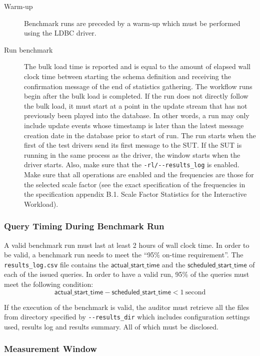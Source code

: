 \begin{description}
    \item[Warm-up] Benchmark runs are preceded by a warm-up which must be performed using the LDBC driver.
    \item[Run benchmark] The bulk load time is reported and is equal to the amount of elapsed wall clock time between starting the schema definition and receiving the confirmation message of the end of statistics gathering. The workflow runs begin after the bulk load is completed. If the run does not directly follow the bulk load, it must start at a point in the update stream that has not previously been played into the database. In other words, a run may only include update events whose timestamp is later than the latest message creation date in the database prior to start of run. The run starts when the first of the test drivers send its first message to the SUT. If the SUT is running in the same process as the driver, the window starts
    when the driver starts. Also, make sure that the \verb|-rl/--results_log| is enabled. Make sure that all operations are enabled and the frequencies are those for the selected scale factor (see the exact specification of the frequencies in the specification appendix B.1. Scale Factor Statistics for the Interactive Workload).
\end{description}

\subsubsection{Query Timing During Benchmark Run}
\label{sec:ontime-requirements}
A valid benchmark run must last at least 2 hours of wall clock time.
In order to be valid, a benchmark run needs to meet the ``95\% on-time requirement''.
The \texttt{results\_log.csv} file contains the $\mathsf{actual\_start\_time}$ and the $\mathsf{scheduled\_start\_time}$ of each of the issued queries. In order to have a valid run, 95\% of the queries must meet the following condition:
\begin{equation*}
\mathsf{actual\_start\_time} - \mathsf{scheduled\_start\_time} < 1\
\mathrm{second}
\end{equation*}

If the execution of the benchmark is valid, the auditor must retrieve all the files from directory specified by \verb|--results_dir| which includes configuration settings used, results log and results summary. All of which must be disclosed.

\subsubsection{Measurement Window}
\label{sec:measurement-window}

